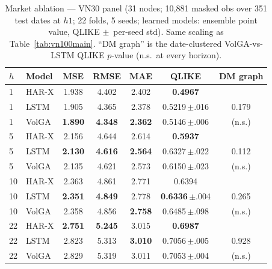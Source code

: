 \documentclass[runningheads]{llncs}
\begin{document}
\begin{table}[t]
\centering
\caption{Market ablation --- VN30 panel (31 nodes; 10{,}881 masked obs over 351 test dates at $h1$;
22 folds, 5 seeds; learned models: ensemble point value, QLIKE $\pm$~per-seed std). Same scaling as
Table~\ref{tab:vn100main}. ``DM graph'' is the date-clustered VolGA-vs-LSTM QLIKE $p$-value (n.s.\ at
every horizon).}
\label{tab:vn30}
\footnotesize
\setlength{\tabcolsep}{6pt}
\begin{tabular}{llccccc}
\toprule
$h$ & Model & MSE & RMSE & MAE & QLIKE & DM graph \\
\midrule
1 & HAR-X & 1.938 & 4.402 & 2.402 & \textbf{0.4967} & \\
1 & LSTM  & 1.905 & 4.365 & 2.378 & 0.5219\,$\pm$.016 & 0.179 \\
1 & VolGA & \textbf{1.890} & \textbf{4.348} & \textbf{2.362} & 0.5146\,$\pm$.006 & (n.s.) \\
\midrule
5 & HAR-X & 2.156 & 4.644 & 2.614 & \textbf{0.5937} & \\
5 & LSTM  & \textbf{2.130} & \textbf{4.616} & \textbf{2.564} & 0.6327\,$\pm$.022 & 0.112 \\
5 & VolGA & 2.135 & 4.621 & 2.573 & 0.6150\,$\pm$.023 & (n.s.) \\
\midrule
10 & HAR-X & 2.363 & 4.861 & 2.771 & 0.6394 & \\
10 & LSTM  & \textbf{2.351} & \textbf{4.849} & 2.778 & \textbf{0.6336}\,$\pm$.004 & 0.265 \\
10 & VolGA & 2.358 & 4.856 & \textbf{2.758} & 0.6485\,$\pm$.098 & (n.s.) \\
\midrule
22 & HAR-X & \textbf{2.751} & \textbf{5.245} & 3.015 & \textbf{0.6987} & \\
22 & LSTM  & 2.823 & 5.313 & \textbf{3.010} & 0.7056\,$\pm$.005 & 0.928 \\
22 & VolGA & 2.829 & 5.319 & 3.011 & 0.7053\,$\pm$.004 & (n.s.) \\
\bottomrule
\end{tabular}
\end{table}
\end{document}
